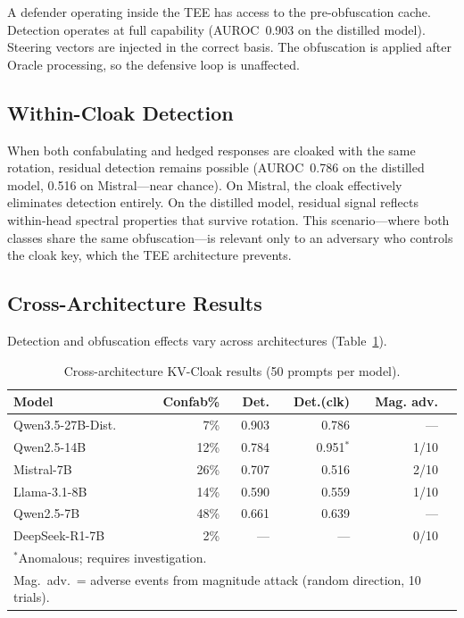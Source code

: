 \documentclass[11pt,a4paper]{article}
\begin{document}
A defender operating inside the TEE has access to the pre-obfuscation
cache. Detection operates at full capability (AUROC~0.903 on the
distilled model). Steering vectors are injected in the correct basis.
The obfuscation is applied after Oracle processing, so the defensive
loop is unaffected.

\subsection{Within-Cloak Detection}

When both confabulating and hedged responses are cloaked with the same
rotation, residual detection remains possible (AUROC~0.786 on the
distilled model, 0.516 on Mistral---near chance). On Mistral, the
cloak effectively eliminates detection entirely. On the distilled model,
residual signal reflects within-head spectral properties that survive
rotation. This scenario---where both classes share the same
obfuscation---is relevant only to an adversary who controls the cloak
key, which the TEE architecture prevents.

\subsection{Cross-Architecture Results}

Detection and obfuscation effects vary across architectures
(Table~\ref{tab:cross_arch}).

\begin{table}[h]
\centering
\caption{Cross-architecture KV-Cloak results (50 prompts per model).}
\label{tab:cross_arch}
\begin{tabular}{lrrrrr}
\toprule
Model & Confab\% & Det. & Det.(clk) & Mag. adv. \\
\midrule
Qwen3.5-27B-Dist. & 7\% & 0.903 & 0.786 & --- \\
Qwen2.5-14B & 12\% & 0.784 & 0.951$^*$ & 1/10 \\
Mistral-7B & 26\% & 0.707 & 0.516 & 2/10 \\
Llama-3.1-8B & 14\% & 0.590 & 0.559 & 1/10 \\
Qwen2.5-7B & 48\% & 0.661 & 0.639 & --- \\
DeepSeek-R1-7B & 2\% & --- & --- & 0/10 \\
\bottomrule
\multicolumn{5}{l}{\footnotesize $^*$Anomalous; requires investigation.} \\
\multicolumn{5}{l}{\footnotesize Mag.\ adv.\ = adverse events from magnitude attack (random direction, 10 trials).}
\end{tabular}
\end{table}
\end{document}
